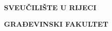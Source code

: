 \thispagestyle{empty}

\vspace{\baselineskip}
\begin{Center}
{\fontsize{14pt}{16.8pt}\selectfont 
\textbf{SVEUČILIŠTE U RIJECI}\par}
\end{Center}\par

\begin{Center}
{\fontsize{14pt}{16.8pt}\selectfont \textbf{GRAĐEVINSKI FAKULTET}\par}
\end{Center}\par


\vspace{\baselineskip}
\begin{Center}
{\fontsize{14pt}{16.8pt}\selectfont \par \textbf{{\studij}}\par}
\end{Center}\par

\begin{Center}
{\fontsize{14pt}{16.8pt}\selectfont \textbf{{\smjer}}\par}
\end{Center}\par

\begin{Center}
{\fontsize{14pt}{16.8pt}\selectfont \textbf{ {\kolegij} }\par}
\end{Center}\par


%
%
%
%
%
%
%
%
%
%
%

\vskip 144pt

